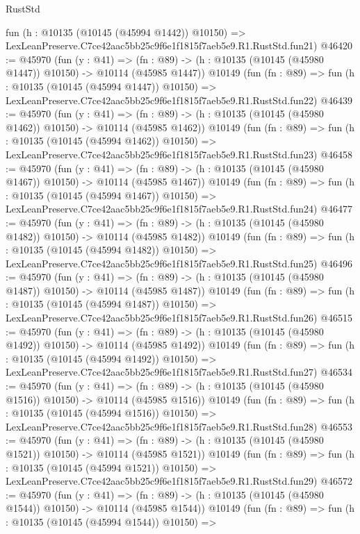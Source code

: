 \begin{lexlean}{RustStd}
\begin{coremodule}
    fun (h : @10135 (@10145 (@45994 @1442)) @10150) =>
    LexLeanPreserve.C7ce42aac5bb25c9f6e1f1815f7aeb5e9.R1.RustStd.fun21)
@46420 := @45970
    (fun (y : @41) =>
    (fn : @89) -> (h : @10135 (@10145 (@45980 @1447)) @10150) -> @10114 (@45985 @1447))
    @10149
    (fun (fn : @89) =>
    fun (h : @10135 (@10145 (@45994 @1447)) @10150) =>
    LexLeanPreserve.C7ce42aac5bb25c9f6e1f1815f7aeb5e9.R1.RustStd.fun22)
@46439 := @45970
    (fun (y : @41) =>
    (fn : @89) -> (h : @10135 (@10145 (@45980 @1462)) @10150) -> @10114 (@45985 @1462))
    @10149
    (fun (fn : @89) =>
    fun (h : @10135 (@10145 (@45994 @1462)) @10150) =>
    LexLeanPreserve.C7ce42aac5bb25c9f6e1f1815f7aeb5e9.R1.RustStd.fun23)
@46458 := @45970
    (fun (y : @41) =>
    (fn : @89) -> (h : @10135 (@10145 (@45980 @1467)) @10150) -> @10114 (@45985 @1467))
    @10149
    (fun (fn : @89) =>
    fun (h : @10135 (@10145 (@45994 @1467)) @10150) =>
    LexLeanPreserve.C7ce42aac5bb25c9f6e1f1815f7aeb5e9.R1.RustStd.fun24)
@46477 := @45970
    (fun (y : @41) =>
    (fn : @89) -> (h : @10135 (@10145 (@45980 @1482)) @10150) -> @10114 (@45985 @1482))
    @10149
    (fun (fn : @89) =>
    fun (h : @10135 (@10145 (@45994 @1482)) @10150) =>
    LexLeanPreserve.C7ce42aac5bb25c9f6e1f1815f7aeb5e9.R1.RustStd.fun25)
@46496 := @45970
    (fun (y : @41) =>
    (fn : @89) -> (h : @10135 (@10145 (@45980 @1487)) @10150) -> @10114 (@45985 @1487))
    @10149
    (fun (fn : @89) =>
    fun (h : @10135 (@10145 (@45994 @1487)) @10150) =>
    LexLeanPreserve.C7ce42aac5bb25c9f6e1f1815f7aeb5e9.R1.RustStd.fun26)
@46515 := @45970
    (fun (y : @41) =>
    (fn : @89) -> (h : @10135 (@10145 (@45980 @1492)) @10150) -> @10114 (@45985 @1492))
    @10149
    (fun (fn : @89) =>
    fun (h : @10135 (@10145 (@45994 @1492)) @10150) =>
    LexLeanPreserve.C7ce42aac5bb25c9f6e1f1815f7aeb5e9.R1.RustStd.fun27)
@46534 := @45970
    (fun (y : @41) =>
    (fn : @89) -> (h : @10135 (@10145 (@45980 @1516)) @10150) -> @10114 (@45985 @1516))
    @10149
    (fun (fn : @89) =>
    fun (h : @10135 (@10145 (@45994 @1516)) @10150) =>
    LexLeanPreserve.C7ce42aac5bb25c9f6e1f1815f7aeb5e9.R1.RustStd.fun28)
@46553 := @45970
    (fun (y : @41) =>
    (fn : @89) -> (h : @10135 (@10145 (@45980 @1521)) @10150) -> @10114 (@45985 @1521))
    @10149
    (fun (fn : @89) =>
    fun (h : @10135 (@10145 (@45994 @1521)) @10150) =>
    LexLeanPreserve.C7ce42aac5bb25c9f6e1f1815f7aeb5e9.R1.RustStd.fun29)
@46572 := @45970
    (fun (y : @41) =>
    (fn : @89) -> (h : @10135 (@10145 (@45980 @1544)) @10150) -> @10114 (@45985 @1544))
    @10149
    (fun (fn : @89) =>
    fun (h : @10135 (@10145 (@45994 @1544)) @10150) =>

\end{coremodule}
\end{lexlean}
